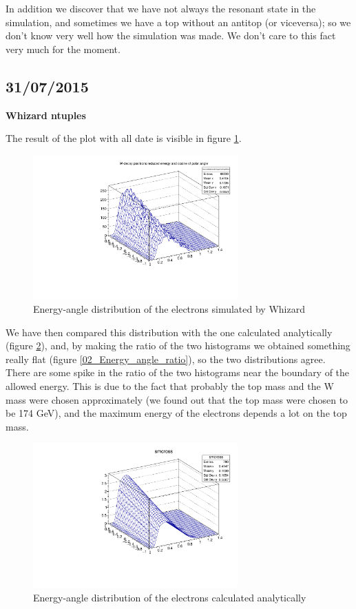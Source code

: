 In addition we discover that we have not always the resonant state in the simulation, and sometimes we have a top without an antitop (or viceversa); so we don't know very well how the simulation was made. We don't care to this fact very much for the moment. 

\subsection{31/07/2015}

\textbf{Whizard ntuples}

The result of the plot with all date is visible in figure \ref{02_Energy_angle_MC}.

\begin{figure} [ht!]
  \centering
  \includegraphics[width=0.7\textwidth]{02_Montecarlo_electron_distribution.pdf}
 \caption{Energy-angle distribution of the electrons simulated by Whizard}
 \label{02_Energy_angle_MC}
\end{figure}

We have then compared this distribution with the one calculated analytically (figure \ref{02_Energy_angle_AN}), and, by making the ratio of the two histograms we obtained something really flat (figure \ref{02_Energy_angle_ratio}), so the two distributions agree. There are some spike in the ratio of the two histograms near the boundary of the allowed energy. This is due to the fact that probably the top mass and the W mass were chosen approximately (we found out that the top mass were chosen to be 174 GeV), and the maximum energy of the electrons depends a lot on the top mass.

\begin{figure} [ht!]
  \centering
  \includegraphics[width=0.7\textwidth]{02_Analytic_electron__distribution.pdf}
 \caption{Energy-angle distribution of the electrons calculated analytically}
 \label{02_Energy_angle_AN}
\end{figure}

